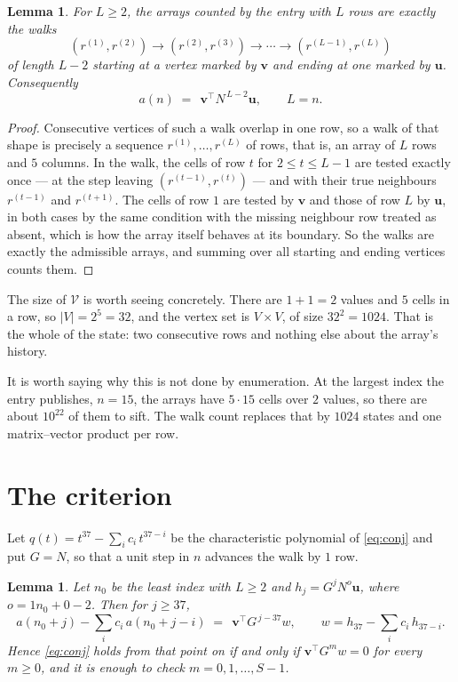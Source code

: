 \documentclass[11pt,a4paper]{article}
\theoremstyle{plain}
\newtheorem{lemma}[theorem]{Lemma}
\theoremstyle{definition}
\begin{document}
\begin{lemma}\label{lem:walk}
For $L\ge2$, the arrays counted by the entry with $L$ rows are exactly the walks
\[
(r^{(1)},r^{(2)})\to(r^{(2)},r^{(3)})\to\cdots\to(r^{(L-1)},r^{(L)})
\]
of length $L-2$ starting at a vertex marked by $\mathbf{v}$ and ending at one marked by
$\mathbf{u}$. Consequently
\[
a(n)\;=\;\,\mathbf{v}^{\!\top}N^{\,L-2}\mathbf{u},\qquad L=n .
\]
\end{lemma}

\begin{proof}
Consecutive vertices of such a walk overlap in one row, so a walk of that shape is
precisely a sequence $r^{(1)},\dots,r^{(L)}$ of rows, that is, an array of $L$ rows
and $5$ columns. In the walk, the cells of row $t$ for $2\le t\le L-1$ are tested
exactly once --- at the step leaving $(r^{(t-1)},r^{(t)})$ --- and with their true
neighbours $r^{(t-1)}$ and $r^{(t+1)}$. The cells of row $1$ are tested by
$\mathbf{v}$ and those of row $L$ by $\mathbf{u}$, in both cases by the same condition
with the missing neighbour row treated as absent, which is how the array itself behaves at
its boundary. So the walks are exactly the admissible arrays, and summing over all starting
and ending vertices counts them.
\end{proof}


The size of $\mathcal V$ is worth seeing concretely. There are $1+1=2$ values
and $5$ cells in a row, so $|V|=2^{5}=32$, and the vertex set is
$V\times V$, of size $32^2=1024$. That is the whole of the state: two consecutive
rows and nothing else about the array's history.

It is worth saying why this is not done by enumeration. At the largest index the entry
publishes, $n=15$, the arrays have $5\cdot15$ cells over
$2$ values, so there are about $10^{22}$ of them to sift. The
walk count replaces that by $1024$ states and one matrix--vector product per row.
\section{The criterion}

Let $q(t)=t^{37}-\sum_i c_i\,t^{37-i}$ be the characteristic polynomial of
\eqref{eq:conj} and put $G=N$, so that a unit step in $n$ advances the walk by
$1$ row.

\begin{lemma}\label{lem:crit}
Let $n_0$ be the least index with $L\ge2$ and $h_j=G^{j}N^{o}\mathbf{u}$, where
$o=1n_0+0-2$. Then for $j\ge37$,
\[
a(n_0+j)-\sum_i c_i\,a(n_0+j-i)\;=\;\,\mathbf{v}^{\!\top}G^{\,j-37}w,
\qquad w=h_{37}-\sum_i c_i\,h_{37-i} .
\]
Hence \eqref{eq:conj} holds from that point on if and only if
$\mathbf{v}^{\!\top}G^{m}w=0$ for every $m\ge0$, and it is enough to check
$m=0,1,\dots,S-1$.
\end{lemma}
\end{document}
